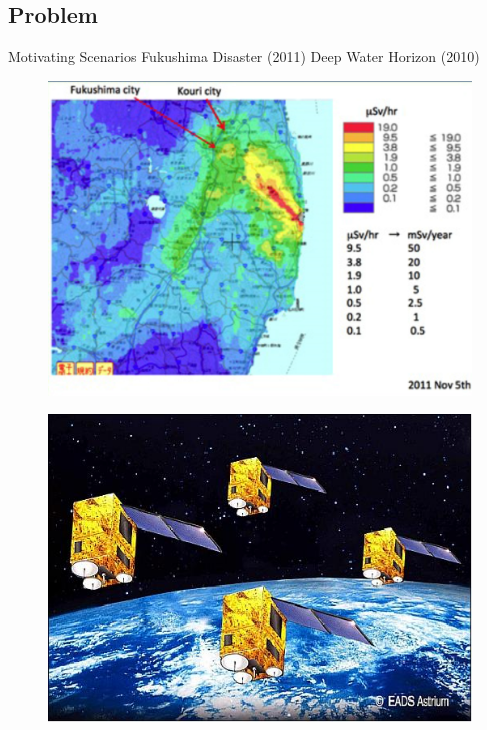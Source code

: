 \subsection{Problem}
\begin{frame}{Motivating Scenarios}
    Fukushima Disaster (2011)
    \hspace{0.4 cm}
    Deep Water Horizon (2010)
    \\
	\begin{minipage}{0.45\textwidth}	
		\begin{figure}
			\includegraphics[width=1\textwidth]{figures/fukushima_disaster.jpg}
		\end{figure}
		\begin{figure}
			\includegraphics[scale=0.2]{figures/Essaim_constellation.jpg}\label{fig:satellite_flock}

\end{figure}
\end{minipage}
\end{frame}
